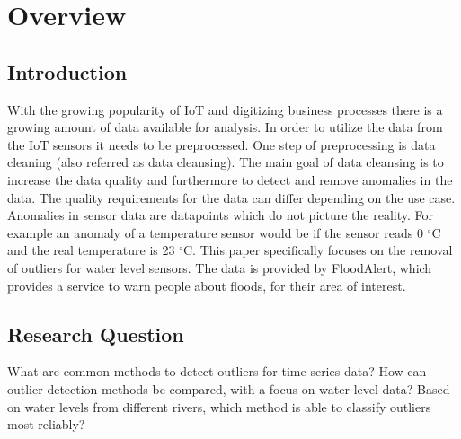 \chapter{Overview}
\section{Introduction}\label{section:introduction}
With the growing popularity of \ac{IoT} and digitizing business processes there is a growing amount of data available for analysis.
In order to utilize the data from the \ac{IoT} sensors it needs to be preprocessed. One step of preprocessing is data cleaning (also referred as data cleansing).
The main goal of data cleansing is to increase the data quality and furthermore to detect and remove anomalies in the data. The quality requirements for the data can differ depending on the use case. Anomalies in sensor data are datapoints which do not picture the reality. For example an anomaly of a temperature sensor would be if the sensor reads 0 $^{\circ}$C and the real temperature is 23 $^{\circ}$C. This paper specifically focuses on the removal of outliers for water level sensors. The data is provided by FloodAlert\cite{strassmayrFloodAlertWaterLevels}, which provides a service to warn people about floods, for their area of interest.

\section{Research Question}
What are common methods to detect outliers for time series data? \newline
How can outlier detection methods be compared, with a focus on water level data? \newline
Based on water levels from different rivers, which method is able to classify outliers most reliably?


